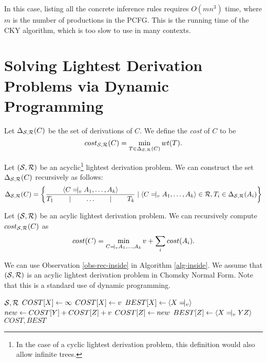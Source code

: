 In this case, listing all the concrete inference rules requires
$O(mn^3)$ time, where $m$ is the number of productions in the
PCFG. This is the running time of the CKY algorithm, which is too slow
to use in many contexts.

\section{Solving Lightest Derivation Problems via Dynamic Programming}

Let $\Delta_{{\mathcal S},{\mathcal R}}(C)$ be the set of derivations of $C$. We
define the {\em cost} of $C$ to be
$$cost_{{\mathcal S},{\mathcal R}}(C) = \min_{T\in \Delta_{{\mathcal S},{\mathcal R}}(C)} wt(T).$$

\begin{obs}
\label{prop-induct-inside}
Let $({\mathcal S},{\mathcal R})$ be an acyclic\footnote{In the case of a cyclic
  lightest derivation problem, this definition would also allow
  infinite trees.}  lightest derivation problem. We can construct the
set $\Delta_{{\mathcal S},{\mathcal R}}(C)$ recursively as follows:
$$
  \Delta_{\SSS,\RRR}(C) = \left\{
    \treee{\langle C\tne_v A_1, \dots, A_k\rangle}{T_1}{\dots}{T_k} \mid
    \langle C\tne_v A_1, \dots, A_k\rangle \in \RRR, T_i \in
    \Delta_{\SSS,\RRR}(A_i)  \right\}
$$
\end{obs}

\begin{obs}
  \label{obs-rec-inside}
  Let $({\mathcal S},{\mathcal R})$ be an acylic lightest derivation problem.  We can
  recursively compute $cost_{{\mathcal S},{\mathcal R}}(C)$ as
$$cost(C) = \min_{C\tne_v A_1,\dots, A_k} v + \sum_i cost(A_i).$$
\end{obs}

We can use Observation \ref{obs-rec-inside} in Algorithm
\ref{alg-inside}. We assume that $({\mathcal S},{\mathcal R})$ is an acylic lightest
derivation problem in Chomsky Normal Form. Note that this is a
standard use of dynamic programming.

\begin{algorithm}
\caption{$lightest\_derivation(\SSS,\RRR)$}
\begin{algorithmic}
  \INPUT ${\mathcal S}, {\mathcal R}$
  \STATE $COST[X] \leftarrow \infty$
  \STATE $COST[X] \leftarrow v$
  \STATE $BEST[X] \from \langle X\tne_v \rangle$
  \ENDIF
  \ENDFOR
  \STATE $new \leftarrow COST[Y] + COST[Z] + v$
  \STATE $COST[Z] \leftarrow new$
  \STATE $BEST[Z] \from \langle X\tne_v YZ \rangle$
  \ENDIF
  \ENDFOR
  \ENDFOR
  \RETURN $COST, BEST$
\end{algorithmic}
\label{alg-inside}
\end{algorithm}

